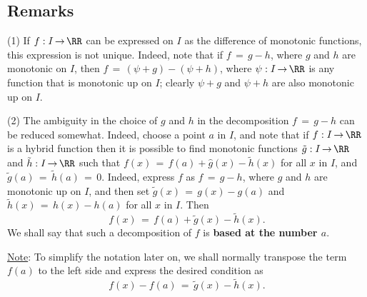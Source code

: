 \V
\V

             \subsection{\small{\bf Remarks}}
            \label{RemrkF40.100}

\V

\hspace*{\parindent}(1) If $f:I \,{\rightarrow}\, {\RR}$ can be expressed on $I$ as the difference of monotonic functions,
    this expression is not unique.
    Indeed, note that if $f \,=\, g-h$, where $g$ and $h$ are monotonic on $I$, then $f \,=\, ({\psi}+g)-({\psi}+h)$, where ${\psi}:I \,{\rightarrow}\, {\RR}$ is any function that is monotonic up on $I$;
    clearly ${\psi}+g$ and ${\psi}+h$ are also monotonic up on $I$.

\V

        (2) The ambiguity in the choice of $g$ and $h$ in the decomposition $f \,=\, g-h$ can be reduced somewhat.
    Indeed, choose a point $a$ in $I$, and note that if $f:I \,{\rightarrow}\, {\RR}$ is a hybrid function then it is possible to find monotonic functions $\tilde{g}:I \,{\rightarrow}\, {\RR}$ and $\tilde{h}:I \,{\rightarrow}\, {\RR}$ such that $f(x) \,=\, f(a)+\hat{g}(x) - \tilde{h}(x)$ for all $x$ in $I$, and $\tilde{g}(a) \,=\, \tilde{h}(a) \,=\, 0$.
    Indeed, express $f$ as $f \,=\, g-h$, where $g$ and $h$ are monotonic up on $I$, and then set $\tilde{g}(x) \,=\, g(x)-g(a)$ and $\tilde{h}(x) \,=\, h(x)-h(a)$ for all $x$ in $I$.
    Then
        \begin{displaymath}
        f(x) \,=\, f(a)+\tilde{g}(x) - \tilde{h}(x).
        \end{displaymath}
\noindent We shall say that such a decomposition of $f$ is {\bf based at the number $a$}.

        \underline{Note}: To simplify the notation later on, we shall normally transpose the term $f(a)$ to the left side and express the desired condition as
        \begin{displaymath}
        f(x)-f(a) \,=\, \tilde{g}(x) - \tilde{h}(x).
        \end{displaymath}

\V

